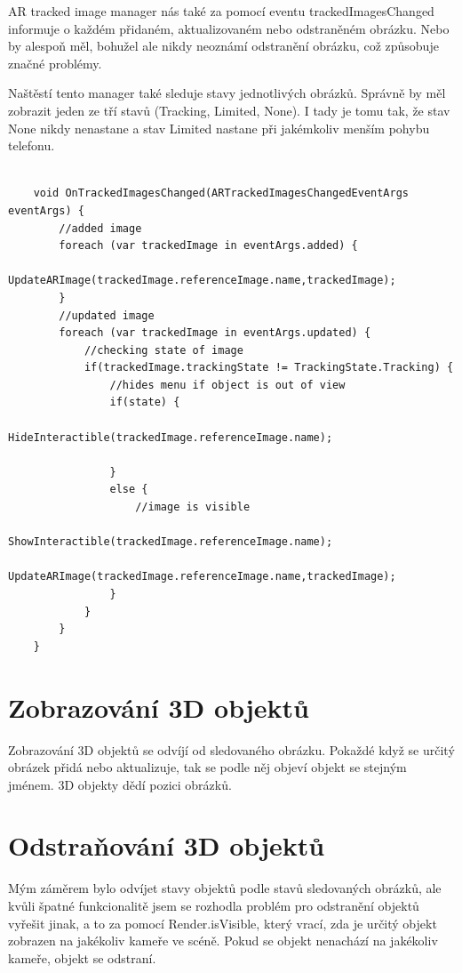 \documentclass[12pt, a4paper,
twoside,        %
openright
]{report}
\begin{document}
AR tracked image manager nás také za pomocí eventu trackedImagesChanged informuje o každém přidaném, aktualizovaném nebo odstraněném obrázku. Nebo by alespoň měl, bohužel ale nikdy neoznámí odstranění obrázku, což způsobuje značné problémy. 

Naštěstí tento manager také sleduje stavy jednotlivých obrázků. Správně by měl zobrazit jeden ze tří stavů (Tracking, Limited, None). I tady je tomu tak, že stav None nikdy nenastane a stav Limited nastane při jakémkoliv menším pohybu telefonu. 


\begin{lstlisting}[style=csh, caption={Ukázka kódu sledování obrázků}]
	
	void OnTrackedImagesChanged(ARTrackedImagesChangedEventArgs eventArgs) {
		//added image
		foreach (var trackedImage in eventArgs.added) {
			UpdateARImage(trackedImage.referenceImage.name,trackedImage);
		}
		//updated image
		foreach (var trackedImage in eventArgs.updated) {
			//checking state of image
			if(trackedImage.trackingState != TrackingState.Tracking) {
				//hides menu if object is out of view
				if(state) {
					HideInteractible(trackedImage.referenceImage.name);
					
				}
				else {
					//image is visible
					ShowInteractible(trackedImage.referenceImage.name);
					UpdateARImage(trackedImage.referenceImage.name,trackedImage);
				}
			}
		}
	}
\end{lstlisting}




\section {Zobrazování 3D objektů}
\label{sec:zobrazovani_3d_objektu}
Zobrazování 3D objektů se odvíjí od sledovaného obrázku. Pokaždé když se určitý obrázek přidá nebo aktualizuje, tak se podle něj objeví objekt se stejným jménem. 3D objekty dědí pozici obrázků. 

\section{Odstraňování 3D objektů}
\label{sec:odstraneni_3d_objektu}
Mým záměrem bylo odvíjet stavy objektů podle stavů sledovaných obrázků, ale kvůli špatné funkcionalitě jsem se rozhodla problém pro odstranění objektů vyřešit jinak, a to za pomocí Render.isVisible, který vrací, zda je určitý objekt zobrazen na jakékoliv kameře ve scéně. Pokud se objekt nenachází na jakékoliv kameře, objekt se odstraní. 
\end{document}
